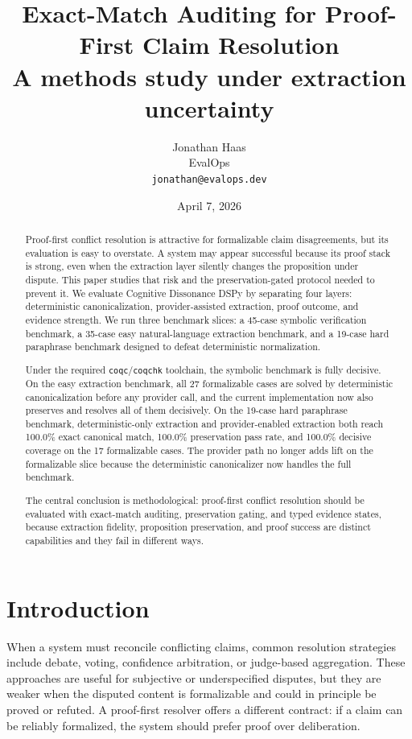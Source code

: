 \documentclass[11pt]{article}
\title{\textbf{Exact-Match Auditing for Proof-First Claim Resolution}\\
\large A methods study under extraction uncertainty}
\author{
  Jonathan Haas \\
  EvalOps \\
  \texttt{jonathan@evalops.dev}
}
\date{April 7, 2026}
\begin{document}
\maketitle

\begin{abstract}
Proof-first conflict resolution is attractive for formalizable claim
disagreements, but its evaluation is easy to overstate. A system may appear
successful because its proof stack is strong, even when the extraction layer
silently changes the proposition under dispute. This paper studies that risk
and the preservation-gated protocol needed to prevent it. We evaluate
Cognitive Dissonance DSPy by separating four layers: deterministic
canonicalization, provider-assisted extraction, proof outcome, and evidence
strength. We run three benchmark slices: a 45-case symbolic verification
benchmark, a 35-case easy natural-language extraction benchmark, and a 19-case
hard paraphrase benchmark designed to defeat deterministic normalization.

Under the required \texttt{coqc}/\texttt{coqchk} toolchain, the symbolic
benchmark is fully decisive. On the easy extraction benchmark, all 27
formalizable cases are solved by deterministic canonicalization before any
provider call, and the current implementation now also preserves and resolves
all of them decisively. On the 19-case hard paraphrase benchmark,
deterministic-only extraction and provider-enabled extraction both reach
100.0\% exact canonical match, 100.0\% preservation pass rate, and 100.0\%
decisive coverage on the 17 formalizable cases. The provider path no longer
adds lift on the formalizable slice because the deterministic canonicalizer now
handles the full benchmark.

The central conclusion is methodological: proof-first conflict resolution
should be evaluated with exact-match auditing, preservation gating, and typed
evidence states, because extraction fidelity, proposition preservation, and
proof success are distinct capabilities and they fail in different ways.
\end{abstract}

\section{Introduction}

When a system must reconcile conflicting claims, common resolution strategies
include debate, voting, confidence arbitration, or judge-based aggregation.
These approaches are useful for subjective or underspecified disputes, but they
are weaker when the disputed content is formalizable and could in principle be
proved or refuted. A proof-first resolver offers a different contract: if a
claim can be reliably formalized, the system should prefer proof over
deliberation.
\end{document}

